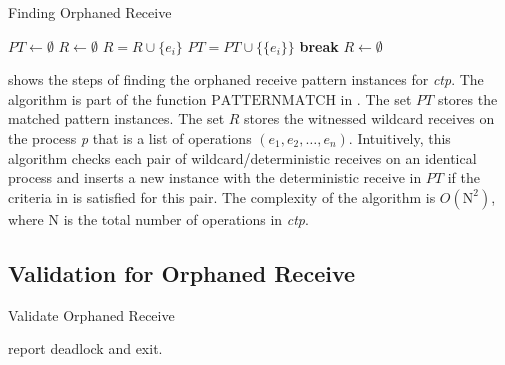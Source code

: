 \begin{algorithm}
\caption{Finding Orphaned Receive}\label{algo:mismatch}
\begin{algorithmic}[1]
\State $\mathit{PT} \gets \emptyset$
\State $\mathit{R} \gets \emptyset$
\State $\mathit{R} = \mathit{R} \cup \{e_i\}$
\EndIf
{}
\State $\mathit{PT} = \mathit{PT} \cup \{\{e_i\}\}$
\State \textbf{break}
\EndIf
\EndFor
\EndIf
\EndFor
\State $\mathit{R} \gets \emptyset$
\EndFor
\end{algorithmic}
\end{algorithm}

 shows the steps of finding the orphaned receive pattern instances for \textit{ctp}. The algorithm is part of the function $\mathrm{PATTERNMATCH}$ in .  
The set $\mathit{PT}$ stores the matched pattern instances.
The set $\mathit{R}$ stores the witnessed wildcard receives on the process \textit{p} that is a list of operations $(e_1, e_2, \dots, e_n)$. 
Intuitively, this algorithm checks each pair of wildcard/deterministic receives on an identical process and inserts a new instance with the deterministic receive in $\mathit{PT}$ if the criteria in  is satisfied for this pair. 
The complexity of the algorithm is $O(\mathrm{N}^2)$, where $\mathrm{N}$ is the total number of operations in \textit{ctp}. 


\subsection{Validation for Orphaned Receive}

\begin{algorithm}
\caption{Validate Orphaned Receive}\label{algo:vorphaned}
\begin{algorithmic}[1]
\State report deadlock and exit.
\EndIf
\end{algorithmic}
\end{algorithm}

